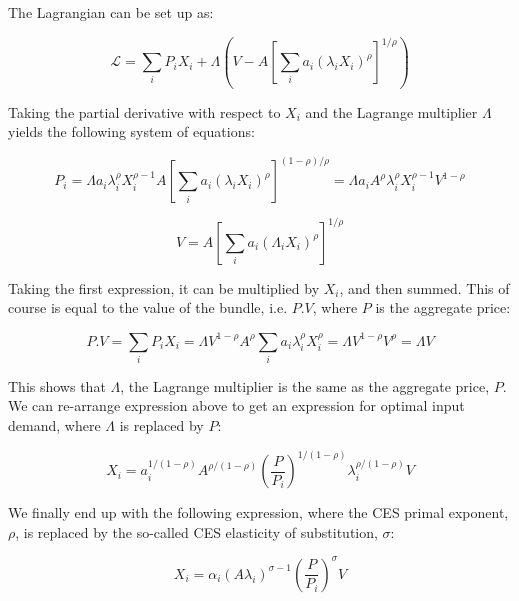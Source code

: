 The Lagrangian can be set up as:

\begin{displaymath}
\mathcal{L}=\sum\limits_{i}{{{P}_{i}}{{X}_{i}}}+\Lambda \left( V-A{{\left[
\sum\limits_{i}{{{a}_{i}}{{({{\lambda }_{i}}{{X}_{i}})}^{\rho }}} \right]}^{1/\rho }} \right)
\end{displaymath}

Taking the partial derivative with respect to $X_i$ and the Lagrange multiplier $\Lambda$ yields the
following system of equations:

\begin{displaymath}
{{P}_{i}}=\Lambda {{a}_{i}}\lambda _{i}^{\rho }X_{i}^{\rho -1}A{{\left[ \sum\limits_{i}{{{a}_{i}}
{{({{\lambda }_{i}}{{X}_{i}})}^{\rho }}}
\right]}^{(1-\rho )/\rho }}=\Lambda {{a}_{i}}{{A}^{\rho }}
\lambda_{i}^{\rho }X_{i}^{\rho -1}{{V}^{1-\rho }}
\end{displaymath}

\begin{displaymath}
V=A{{\left[ \sum\limits_{i}{{{a}_{i}}{{({{\Lambda }_{i}}{{X}_{i}})}^{\rho }}} \right]}^{1/\rho }}
\end{displaymath}

Taking the first expression, it can be multiplied by $X_i$, and then summed. This of course is
equal to the value of the bundle, i.e. $P.V$, where $P$ is the aggregate price:

\begin{displaymath}
P.V=\sum\limits_{i}{{{P}_{i}}{{X}_{i}}}=\Lambda {{V}^{1-\rho }}{{A}^{\rho }}
\sum\limits_{i}{{{a}_{i}}\lambda_{i}^{\rho }X_{i}^{\rho }}=
\Lambda {{V}^{1-\rho }}{{V}^{\rho }}=\Lambda V
\end{displaymath}

This shows that $\Lambda$, the Lagrange multiplier is the same as the aggregate price, $P$. We can
re-arrange expression above to get an expression for optimal input demand, where $\Lambda$ is
replaced by $P$:

\begin{displaymath}
{{X}_{i}}=a_{i}^{1/(1-\rho )}{{A}^{\rho /(1-\rho )}}{{\left( \frac{P}{{{P}_{i}}}
\right)}^{1/(1-\rho )}}\lambda_{i}^{\rho /(1-\rho )}V
\end{displaymath}

We finally end up with the following expression, where the CES primal exponent, $\rho$, is
replaced by the so-called CES elasticity of substitution, $\sigma$:

\begin{equation} \label{eq:CESFOC}
{{X}_{i}}={{\alpha }_{i}} {{\left( A \lambda _{i} \right) }^{\sigma -1}}
{{\left( \frac{P}{{{P}_{i}}} \right)}^{\sigma }} V
\end{equation}

